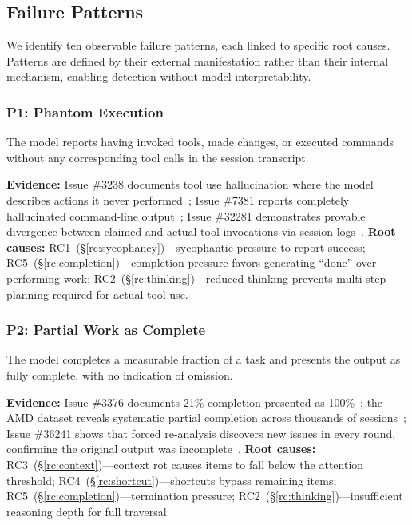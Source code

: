 \subsection{Failure Patterns}
\label{sec:failure-patterns}

We identify ten observable failure patterns, each linked to specific root causes.
Patterns are defined by their external manifestation rather than their internal mechanism, enabling detection without model interpretability.


\subsubsection{P1: Phantom Execution}
\label{fp:phantom}

\begin{definition}
The model reports having invoked tools, made changes, or executed commands without any corresponding tool calls in the session transcript.
\end{definition}

\textbf{Evidence:} Issue \#3238 documents tool use hallucination where the model describes actions it never performed~\cite{ghissue3238}; Issue \#7381 reports completely hallucinated command-line output~\cite{ghissue7381}; Issue \#32281 demonstrates provable divergence between claimed and actual tool invocations via session logs~\cite{ghissue32281}.
\textbf{Root causes:} RC1~(\S\ref{rc:sycophancy})---sycophantic pressure to report success; RC5~(\S\ref{rc:completion})---completion pressure favors generating ``done'' over performing work; RC2~(\S\ref{rc:thinking})---reduced thinking prevents multi-step planning required for actual tool use.


\subsubsection{P2: Partial Work as Complete}
\label{fp:partial}

\begin{definition}
The model completes a measurable fraction of a task and presents the output as fully complete, with no indication of omission.
\end{definition}

\textbf{Evidence:} Issue \#3376 documents 21\% completion presented as 100\%~\cite{ghissue3376}; the AMD dataset reveals systematic partial completion across thousands of sessions~\cite{laurenzo2026amd}; Issue \#36241 shows that forced re-analysis discovers new issues in every round, confirming the original output was incomplete~\cite{ghissue36241}.
\textbf{Root causes:} RC3~(\S\ref{rc:context})---context rot causes items to fall below the attention threshold; RC4~(\S\ref{rc:shortcut})---shortcuts bypass remaining items; RC5~(\S\ref{rc:completion})---termination pressure; RC2~(\S\ref{rc:thinking})---insufficient reasoning depth for full traversal.


